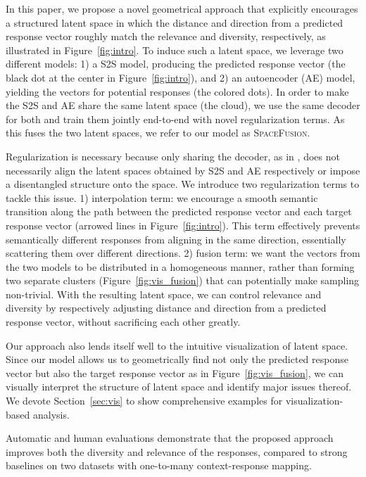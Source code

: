 \documentclass[11pt,a4paper]{article}
\begin{document}
 

In this paper, we propose a novel geometrical approach that explicitly encourages a structured latent space in which the distance and direction from a predicted response vector roughly match the relevance and diversity, respectively, as illustrated in Figure~\ref{fig:intro}. 
To induce such a latent space, we leverage two different models: 1) a S2S model, producing the predicted response vector (the black dot at the center in Figure~\ref{fig:intro}), and 2) an autoencoder (AE) model, yielding the vectors for potential responses (the colored dots). In order to make the S2S and AE share the same latent space (the cloud), we use the same decoder for both and train them jointly end-to-end with novel regularization terms. As this fuses the two latent spaces, we refer to our model as \textsc{SpaceFusion}.

Regularization is necessary because only sharing the decoder, as in \cite{luan2017mtask}, does not necessarily align the latent spaces obtained by S2S and AE respectively or impose a disentangled structure onto the space. We introduce two regularization terms to tackle this issue. 1) interpolation term: we encourage a smooth semantic transition along the path between the predicted response vector and each target response vector (arrowed lines in Figure~\ref{fig:intro}). This term effectively prevents semantically 
different responses from aligning in the same direction, essentially scattering them over different directions. 2) fusion term: we want the vectors from the two models to be distributed in a homogeneous manner, rather than forming two separate clusters (Figure~\ref{fig:vis_fusion}) that can potentially make sampling non-trivial. 
With the resulting latent space, we can control relevance and diversity by respectively adjusting distance and direction from a predicted response vector, without sacrificing each other greatly.





Our approach also lends itself well to the intuitive visualization of latent space.
Since our model allows us to geometrically find not only the predicted response vector but also the target response vector as in Figure~\ref{fig:vis_fusion}, we can visually interpret the structure of latent space and identify major issues thereof. We devote Section~\ref{sec:vis} to show comprehensive examples for visualization-based analysis. 




Automatic and human evaluations demonstrate that the proposed approach improves both the diversity and relevance of the responses, compared to strong baselines on two datasets with one-to-many context-response mapping.
\end{document}
